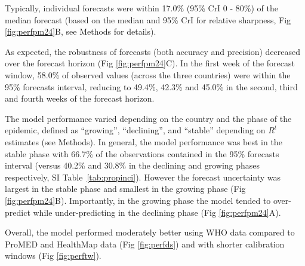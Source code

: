 \documentclass[9pt,twocolumn,twoside,lineno]{pnas-new}
\begin{document}
Typically, individual forecasts were within 17.0\% (95\% CrI 0 - 80\%)
of the median forecast (based on the median and 95\% CrI for
relative sharpness, Fig \ref{fig:perfpm24}B, see Methods for details).

As expected, the robustness of forecasts (both accuracy and precision)
decreased over the forecast
horizon (Fig \ref{fig:perfpm24}C). In the first week of the forecast window, 58.0\% of
observed values (across the three countries) were within the 95\%
forecasts interval, reducing to 49.4\%, 42.3\% and 45.0\% in the
second, third and fourth weeks of the forecast horizon. 

The model performance varied depending on the country and
the phase of the epidemic, defined as ``growing'', ``declining'', and 
``stable'' depending on $R^t$ estimates (see Methods). In
general, the model performance was best in the stable phase with
66.7\% of the observations contained in the 95\% forecasts interval
(versus 40.2\% and 30.8\% in the declining and growing phases respectively,
SI Table~\ref{tab:propinci}). However the forecast uncertainty was largest in the stable
phase and smallest in the growing phase (Fig \ref{fig:perfpm24}B).
Importantly, in the growing phase the model tended to over-predict
while under-predicting in the declining phase (Fig
\ref{fig:perfpm24}A). 

Overall, the model performed moderately better using WHO data compared
to ProMED and HealthMap data (Fig \ref{fig:perfds}) and with shorter 
calibration windows (Fig \ref{fig:perftw}).
\end{document}
